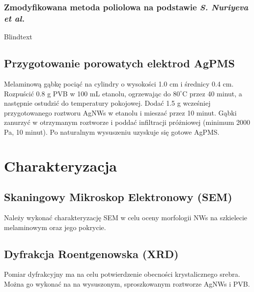 \documentclass[12pt,a4paper]{article}
\begin{document}
\subsubsection{Zmodyfikowana metoda poliolowa na podstawie \emph{S. Nuriyeva et al.} \cite{PoliolMod}}
Blindtext

\subsection{Przygotowanie porowatych elektrod AgPMS}
Melaminową gąbkę pociąć na cylindry o wysokości 1.0 cm i średnicy 0.4 cm. Rozpuścić 0.8 g PVB w 100 mL etanolu, ogrzewając do $80^\circ$C przez 40 minut, a następnie ostudzić do temperatury pokojowej. Dodać 1.5 g wcześniej przygotowanego roztworu AgNWs w etanolu i mieszać przez 10 minut. Gąbki zanurzyć w otrzymanym roztworze i poddać infiltracji próżniowej (minimum 2000 Pa, 10 minut). Po naturalnym wysuszeniu uzyskuje się gotowe AgPMS.

\section{Charakteryzacja}
\subsection{Skaningowy Mikroskop Elektronowy (SEM)}
Należy wykonać charakteryzację SEM w celu oceny morfologii NWs na szkielecie melaminowym oraz jego pokrycie.

\subsection{Dyfrakcja Roentgenowska (XRD)}
Pomiar dyfrakcyjny ma na celu potwierdzenie obecności krystalicznego srebra. Można go wykonać na na wysuszonym, sproszkowanym roztworze AgNWs i PVB.



\end{document}
